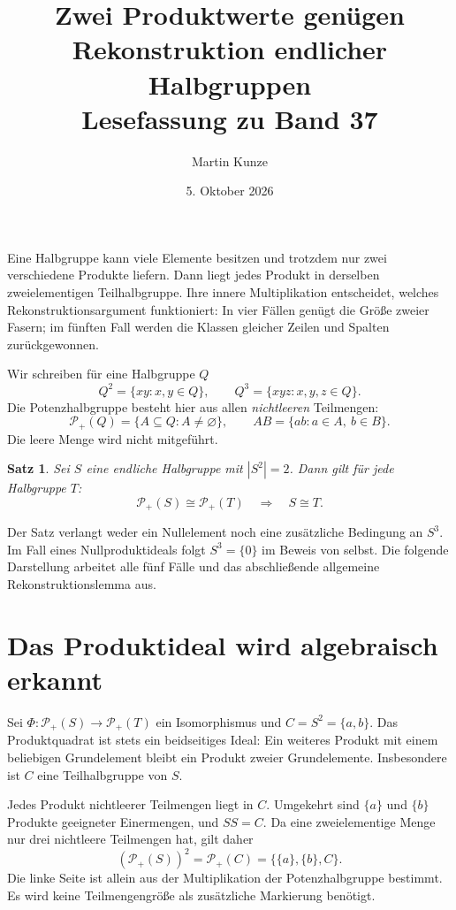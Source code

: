 \documentclass[a4paper,11pt]{article}
\title{Zwei Produktwerte genügen\\[.5em]
\large Rekonstruktion endlicher Halbgruppen\\Lesefassung zu Band 37}
\author{Martin Kunze}
\date{5. Oktober 2026}
\newcommand{\Pp}[1]{\mathcal P_+(#1)}
\newtheorem{satz}{Satz}
\begin{document}
\maketitle

Eine Halbgruppe kann viele Elemente besitzen und trotzdem nur zwei
verschiedene Produkte liefern. Dann liegt jedes Produkt in derselben
zweielementigen Teilhalbgruppe. Ihre innere Multiplikation entscheidet,
welches Rekonstruktionsargument funktioniert: In vier Fällen genügt die
Größe zweier Fasern; im fünften Fall werden die Klassen gleicher Zeilen
und Spalten zurückgewonnen.

Wir schreiben für eine Halbgruppe \(Q\)
\[
 Q^2=\{xy:x,y\in Q\},\qquad Q^3=\{xyz:x,y,z\in Q\}.
\]
Die Potenzhalbgruppe besteht hier aus allen \emph{nichtleeren} Teilmengen:
\[
 \Pp Q=\{A\subseteq Q:A\ne\varnothing\},\qquad
 AB=\{ab:a\in A,\ b\in B\}.
\]
Die leere Menge wird nicht mitgeführt.

\begin{satz}\label{tw:main}
Sei \(S\) eine endliche Halbgruppe mit \(|S^2|=2\). Dann gilt für jede
Halbgruppe \(T\):
\[
 \Pp S\cong\Pp T\quad\Longrightarrow\quad S\cong T.
\]
\end{satz}

Der Satz verlangt weder ein Nullelement noch eine zusätzliche Bedingung
an \(S^3\). Im Fall eines Nullproduktideals folgt \(S^3=\{0\}\) im
Beweis von selbst. Die folgende Darstellung arbeitet alle fünf Fälle
und das abschließende allgemeine Rekonstruktionslemma aus.

\section{Das Produktideal wird algebraisch erkannt}

Sei \(\Phi:\Pp S\to\Pp T\) ein Isomorphismus und
\(C=S^2=\{a,b\}\). Das Produktquadrat ist stets ein beidseitiges
Ideal: Ein weiteres Produkt mit einem beliebigen Grundelement bleibt
ein Produkt zweier Grundelemente. Insbesondere ist \(C\) eine
Teilhalbgruppe von \(S\).

Jedes Produkt nichtleerer Teilmengen liegt in \(C\). Umgekehrt sind
\(\{a\}\) und \(\{b\}\) Produkte geeigneter Einermengen, und
\(SS=C\). Da eine zweielementige Menge nur drei nichtleere Teilmengen
hat, gilt daher
\begin{equation}\label{tw:square}
 (\Pp S)^2=\Pp C=\bigl\{\{a\},\{b\},C\bigr\}.
\end{equation}
Die linke Seite ist allein aus der Multiplikation der Potenzhalbgruppe
bestimmt. Es wird keine Teilmengengröße als zusätzliche Markierung
benötigt.
\end{document}
